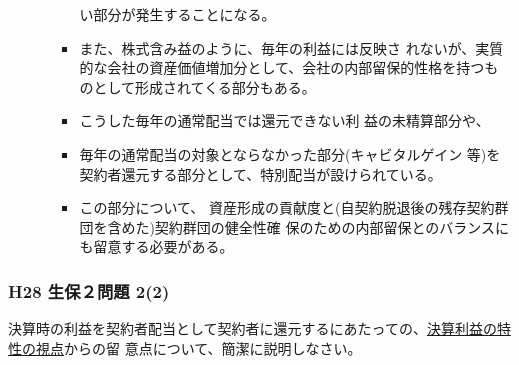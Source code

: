 \documentclass[report,gutter=10mm,fore-edge=10mm,uplatex,dvipdfmx]{jlreq}
\begin{document}
\begin{enumerate}
\begin{enumerate}
\begin{itemize}
い部分が発生することになる。
 \item また、株式含み益のように、毎年の利益には反映さ
れないが、実質的な会社の資産価値増加分として、会社の内部留保的性格を持つも
のとして形成されてくる部分もある。
 \item こうした毎年の通常配当では還元できない利
益の未精算部分や、
 \item 
毎年の通常配当の対象とならなかった部分(キャビタルゲイン
等)を契約者還元する部分として、特別配当が設けられている。
 \item 
この部分について、
資産形成の貢献度と(自契約脱退後の残存契約群団を含めた)契約群団の健全性確
保のための内部留保とのバランスにも留意する必要がある。
\end{itemize}
\end{enumerate}
\end{enumerate}


\subsubsection{H28 生保２問題 2(2)}
決算時の利益を契約者配当として契約者に還元するにあたっての、\underline{決算利益の特性の視点}からの留
意点について、簡潔に説明しなさい。
\end{document}
